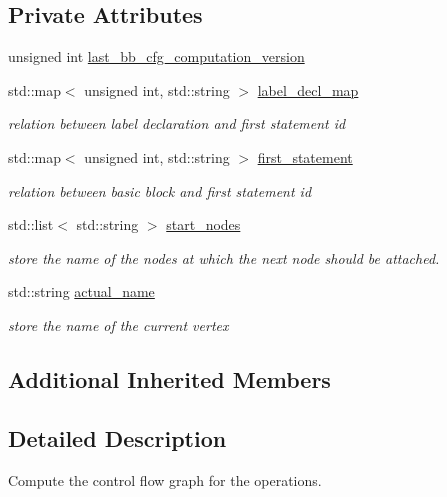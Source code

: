 \subsection*{Private Attributes}
\begin{DoxyCompactItemize}
\item 
unsigned int \hyperlink{classoperations__cfg__computation_afc96a2e50d26b0b82d0a50ee8084fd69}{last\+\_\+bb\+\_\+cfg\+\_\+computation\+\_\+version}
\item 
std\+::map$<$ unsigned int, std\+::string $>$ \hyperlink{classoperations__cfg__computation_a376558dd1ae44b3a523bc4482fd9f9ec}{label\+\_\+decl\+\_\+map}
\begin{DoxyCompactList}\small\item\em relation between label declaration and first statement id \end{DoxyCompactList}\item 
std\+::map$<$ unsigned int, std\+::string $>$ \hyperlink{classoperations__cfg__computation_af1b5e6119a42455a86fa01e3f3ec3f4b}{first\+\_\+statement}
\begin{DoxyCompactList}\small\item\em relation between basic block and first statement id \end{DoxyCompactList}\item 
std\+::list$<$ std\+::string $>$ \hyperlink{classoperations__cfg__computation_adfd410fb60f942075cecc8c45afb7f41}{start\+\_\+nodes}
\begin{DoxyCompactList}\small\item\em store the name of the nodes at which the next node should be attached. \end{DoxyCompactList}\item 
std\+::string \hyperlink{classoperations__cfg__computation_ab7ad207edecdf0376496f570bd70638b}{actual\+\_\+name}
\begin{DoxyCompactList}\small\item\em store the name of the current vertex \end{DoxyCompactList}\end{DoxyCompactItemize}
\subsection*{Additional Inherited Members}


\subsection{Detailed Description}
Compute the control flow graph for the operations. 

